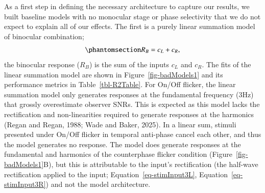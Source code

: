 \documentclass[review,
  12pt,
]{elsarticle}
\begin{document}
As a first step in defining the necessary architecture to capture our
results, we built baseline models with no monocular stage or phase
selectivity that we do not expect to explain all of our effects. The
first is a purely linear summation model of binocular combination;
\begin{equation}\phantomsection\label{eq-linearSumModel}{
R_B = c_L+c_R,
}\end{equation} the binocular response (\(R_B\)) is the sum of the
inputs \(c_L\) and \(c_R\). The fits of the linear summation model are
shown in Figure~\ref{fig-badModels1} and its performance metrics in
Table~\ref{tbl-R2Table}. For On/Off flicker, the linear summation model
only generates responses at the fundamental frequency (3Hz) that grossly
overestimate observer SNRs. This is expected as this model lacks the
rectification and non-linearities required to generate responses at the
harmonics (Regan and Regan, 1988; Wade and Baker, 2025). In a linear
sum, stimuli presented under On/Off flicker in temporal anti-phase
cancel each other, and thus the model generates no response. The model
does generate responses at the fundamental and harmonics of the
counterphase flicker condition (Figure~\ref{fig-badModels1}B), but this
is attributable to the input's rectification (the half-wave
rectification applied to the input;
Equation~\ref{eq-stimInput3L}, Equation~\ref{eq-stimInput3R}) and not
the model architecture.
\end{document}
